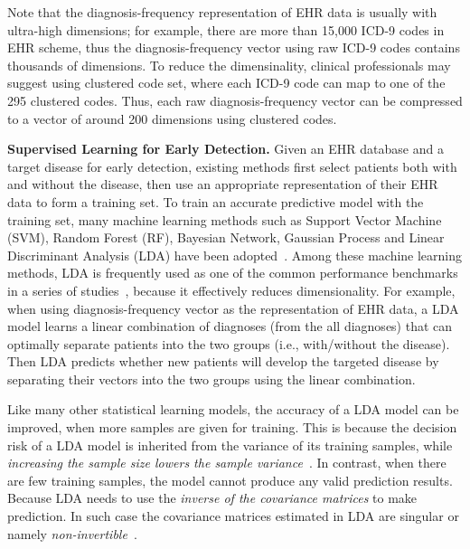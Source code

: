 Note that the diagnosis-frequency representation of EHR data is usually with ultra-high dimensions; for example, there are more than 15,000 ICD-9 codes in EHR scheme, thus the diagnosis-frequency vector using raw ICD-9 codes contains thousands of dimensions.
To reduce the dimensinality, clinical professionals may suggest using clustered code set, where each ICD-9 code can map to  one of the 295 clustered codes.
Thus, each raw diagnosis-frequency vector can be compressed to a vector of around 200 dimensions using clustered codes.
 

\textbf{Supervised Learning for Early Detection.} Given an EHR database and a target disease for early detection, existing methods first select patients both with and without the disease, then use an appropriate representation of their EHR data to form a training set.
To train an accurate predictive model with the training set, many machine learning methods such as Support Vector Machine (SVM), Random Forest (RF), Bayesian Network, Gaussian Process and Linear Discriminant Analysis (LDA) have been adopted~\cite{sun2012supervised,7091853,personalized2015,zhang_mseq_2015,jensen2001mining,liu_temporal_2015,cazzanti_local_2007}.
Among these machine learning methods, LDA is frequently used as one of the common performance benchmarks in a series of studies~\cite{cazzanti_local_2007,zhang_mseq_2015,kalina2013selecting,karlsson2014handling,wang2014clinical}, because it effectively reduces dimensionality.
For example, when using diagnosis-frequency vector as the representation of EHR data, a LDA model learns a linear combination of diagnoses (from the all diagnoses) that can optimally separate patients into the two groups (i.e., with/without the disease).
Then LDA predicts whether new patients will develop the targeted disease by separating their vectors into the two groups using the linear combination.
 

Like many other statistical learning models, the accuracy of a LDA model can be improved, when more samples are given for training.
This is because the decision risk of a LDA model is inherited from the variance of its training samples, while \emph{increasing the sample size lowers the sample variance}~\cite{hsu1947complete,qiao2008effective}.
In contrast, when there are few training samples, the model cannot produce any valid prediction results.
Because LDA needs to use the \emph{inverse of the covariance matrices} to make prediction.
In such case the covariance matrices estimated in LDA are singular or namely \emph{non-invertible}~\cite{huang2002solving,gao2006direct}.
 

